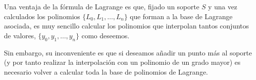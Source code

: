  \begin{remark}
   Una ventaja de la fórmula de Lagrange es que, fijado un soporte $S$
   y una vez calculados los polinomios $\{L_0,L_1,\dots, L_n\}$ que
   forman a la base de Lagrange asociada, es muy sencillo calcular los
   polinomios que interpolan tantos conjuntos de valores,
   $\{y_0,y_1,\dots,y_n\}$ como deseemos.

   Sin embargo, su inconveniente es que si deseamos añadir un punto más
   al soporte (y por tanto realizar la interpolación con un polinomio
   de un grado mayor) es necesario volver a calcular toda la base de
   polinomios de Lagrange.
 \end{remark}

